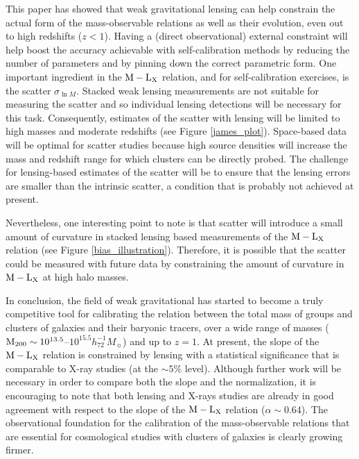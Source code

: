 \documentclass[12pt]{emulateapj}
\newcommand{\mlx}{$\rm{M} - \rm{L}_{\rm X}$ }
\newcommand{\mass}{h_{72}^{-1} M_{\sun}}
\begin{document}
This paper has showed that weak gravitational lensing can help
constrain the actual form of the mass-observable relations as well as
their evolution, even out to high redshifts ($z<1$). Having a (direct
observational) external constraint will help boost the accuracy
achievable with self-calibration methods by reducing the number of
parameters and by pinning down the correct parametric form. One
important ingredient in the \mlx relation, and for self-calibration
exercises, is the scatter $\sigma_{\ln M}$. Stacked weak lensing
measurements are not suitable for measuring the scatter and so
individual lensing detections will be necessary for this
task. Consequently, estimates of the scatter with lensing will be
limited to high masses and moderate redshifts (see Figure
\ref{james_plot}). Space-based data will be optimal for scatter
studies because high source densities will increase the mass and
redshift range for which clusters can be directly probed. The
challenge for lensing-based estimates of the scatter will be to ensure
that the lensing errors are smaller than the intrinsic scatter, a
condition that is probably not achieved at present.

Nevertheless, one interesting point to note is that scatter will
introduce a small amount of curvature in stacked lensing based
measurements of the \mlx relation (see Figure
\ref{bias_illustration}). Therefore, it is possible that the scatter
could be measured with future data by constraining the amount of
curvature in \mlx at high halo masses.\vspace{0.05 in}

In conclusion, the field of weak gravitational has started to become a
truly competitive tool for calibrating the relation between the total
mass of groups and clusters of galaxies and their baryonic tracers,
over a wide range of masses ($\rm{M}_{\rm 200} \sim
10^{13.5}$--$10^{15.5} \mass$) and up to $z=1$. At present, the slope
of the \mlx relation is constrained by lensing with a statistical
significance that is comparable to X-ray studies (at the $\sim 5\%$
level). Although further work will be necessary in order to compare
both the slope and the normalization, it is encouraging to note that
both lensing and X-rays studies are already in good agreement with
respect to the slope of the \mlx relation ($\alpha \sim 0.64$). The
observational foundation for the calibration of the mass-observable
relations that are essential for cosmological studies with clusters of
galaxies is clearly growing firmer.\vspace{0.05 in}
\end{document}
